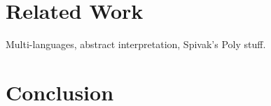 \documentclass[sigplan,10pt,review,anonymous]{acmart}
\begin{document}
\section{Related Work}

Multi-languages,
abstract interpretation,
Spivak's Poly stuff.

\section{Conclusion}




\newpage
\appendix

%
%
%
%
%
%
%
\end{document}
